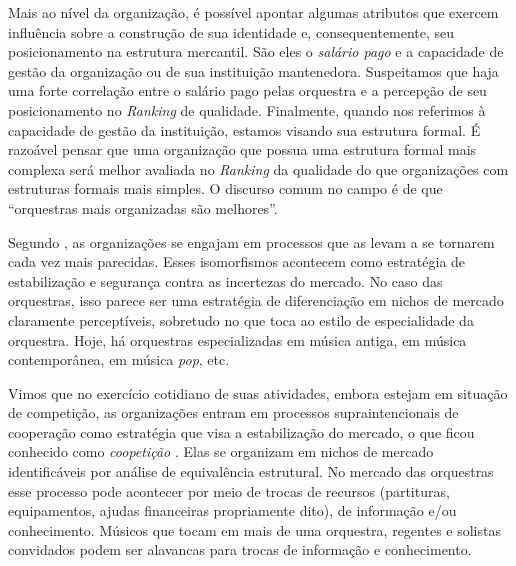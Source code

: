 \documentclass[a4paper, 12pt, openright, oneside, german, french, english, brazil]{abntex2}
\begin{document}
	Mais ao nível da organização, é possível apontar algumas atributos que exercem influência sobre a construção de sua identidade e, consequentemente, seu posicionamento na estrutura mercantil. São eles o \textit{salário pago} e a capacidade de gestão da organização ou de sua instituição mantenedora. Suspeitamos que haja uma forte correlação entre o salário pago pelas orquestra e a percepção de seu posicionamento no \textit{Ranking} de qualidade. 
	Finalmente, quando nos referimos à capacidade de gestão da instituição, estamos visando sua estrutura formal. É razoável pensar que uma organização que possua uma estrutura formal mais complexa será melhor avaliada no \textit{Ranking} da qualidade do que organizações com estruturas formais mais simples. O discurso comum no campo é de que ``orquestras mais organizadas são melhores''.

	Segundo , as organizações se engajam em processos que as levam a se tornarem cada vez mais parecidas. Esses isomorfismos acontecem como estratégia de estabilização e segurança contra as incertezas do mercado. No caso das orquestras, isso parece ser uma estratégia de diferenciação em nichos de mercado claramente perceptíveis, sobretudo no que toca ao estilo de especialidade da orquestra. Hoje, há orquestras especializadas em música antiga, em música contemporânea, em música \textit{pop}, etc.


	Vimos que no exercício cotidiano de suas atividades, embora estejam em situação de competição, as organizações entram em processos supraintencionais de cooperação como estratégia que visa a estabilização do mercado, o que ficou conhecido como \textit{coopetição} \cite{lazega2009theorie}. Elas se organizam em nichos de mercado identificáveis por análise de equivalência estrutural. No mercado das orquestras esse processo pode acontecer por meio de trocas de recursos (partituras, equipamentos, ajudas financeiras propriamente dito), de informação e/ou conhecimento. Músicos que tocam em mais de uma orquestra, regentes e solistas convidados podem ser alavancas para trocas de informação e conhecimento.
\end{document}
